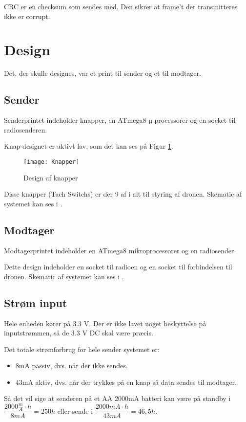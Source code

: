 \documentclass[Main]{subfiles}
\begin{document}
CRC er en checksum som sendes med. 
Den sikrer at frame't der transmitteres ikke er corrupt.



\section{Design}
Det, der skulle designes, var et print til sender og et til modtager.

\subsection{Sender}
Senderprintet indeholder knapper, en ATmega8 µ-processorer og en socket til radiosenderen.

Knap-designet er aktivt lav, som det kan ses på Figur \ref{fig: Knapper}.


\begin{figure}[H]
\centering
\texttt{[image: Knapper]}
\caption{Design af knapper}
\label{fig: Knapper}
\end{figure}

Disse knapper (Tach Switchs) er der 9 af i alt til styring af dronen.
Skematic af systemet kan ses i \cite{SenderSCM}.
\subsection{Modtager}
Modtagerprintet indeholder en ATmega8 mikroprocessorer og en radiosender.

Dette design indeholder en socket til radioen og en socket til \itoc forbindelsen til dronen.
Skematic af systemet kan ses i \cite{ModtagerSCM}.


\subsection{Strøm input}

Hele enheden kører på 3.3 V.
Der er ikke lavet noget beskyttelse på inputstrømmen, så de 3.3 V DC skal være præcis.

Det totale strømforbrug for hele sender systemet er:
\begin{itemize}
\item 8mA passiv, dvs. når der ikke sendes.
\item 43mA aktiv, dvs. når der trykkes på en knap så data sendes til modtager.
\end{itemize}

Så det vil sige at senderen på et AA 2000mA batteri kan være på standby i $\dfrac{2000 \frac mA\cdot h}{8 mA} = 250 h$ eller sende i $\dfrac{2000 mA \cdot h}{43 mA} = 46,5 h$.
\end{document}
